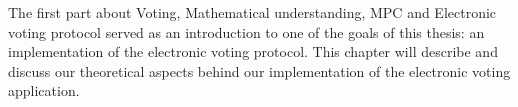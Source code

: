 \noindent
The first part about Voting, Mathematical understanding, MPC and Electronic voting protocol served as an introduction to one of the goals of this thesis: an implementation of the electronic voting protocol. This chapter will describe and discuss our theoretical aspects behind our implementation of the electronic voting application.  
















